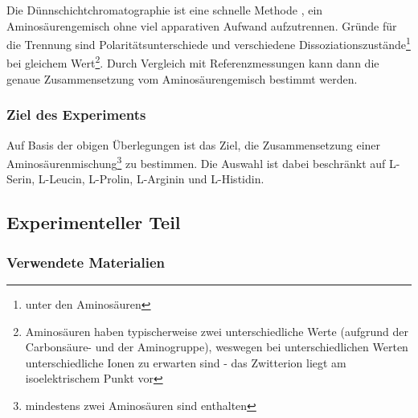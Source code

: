 \documentclass{article}
\begin{document}
        Die Dünnschichtchromatographie ist eine schnelle Methode \cite[S. 148]{TaschenatlasAnallytik}, ein Aminosäurengemisch ohne viel apparativen Aufwand aufzutrennen. Gründe für die Trennung sind Polaritätsunterschiede und verschiedene Dissoziationszustände\footnote{unter den Aminosäuren} bei gleichem \pH Wert\footnote{Aminosäuren haben typischerweise zwei unterschiedliche \pKa Werte (aufgrund der Carbonsäure- und der Aminogruppe), weswegen bei unterschiedlichen \pH Werten unterschiedliche Ionen zu erwarten sind - das Zwitterion liegt am isoelektrischem Punkt vor}. Durch Vergleich mit Referenzmessungen kann dann die genaue Zusammensetzung vom Aminosäurengemisch bestimmt werden.

      \subsubsection{Ziel des Experiments}
        
        Auf Basis der obigen Überlegungen ist das Ziel, die Zusammensetzung einer Aminosäurenmischung\footnote{mindestens zwei Aminosäuren sind enthalten} zu bestimmen. Die Auswahl ist dabei beschränkt auf L-Serin, L-Leucin, L-Prolin, L-Arginin und L-Histidin.
    
    \subsection{Experimenteller Teil}
  
      \subsubsection{Verwendete Materialien}
              
\end{document}

